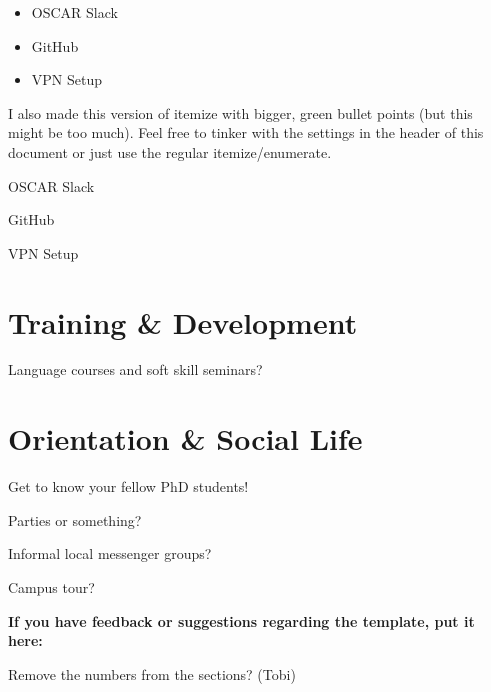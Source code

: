 \documentclass[a4paper,12pt]{article}
\begin{document}
\begin{itemize}
  \item OSCAR Slack
  \item GitHub
  \item VPN Setup
\end{itemize}

I also made this version of itemize with bigger, green bullet points (but this might be too much). Feel free to tinker with the settings in the header of this document or just use the regular itemize/enumerate.

\begin{fancyitemize}
  \item OSCAR Slack
  \item GitHub
  \item VPN Setup
\end{fancyitemize}

\section{Training \& Development}
Language courses and soft skill seminars?

\section{Orientation \& Social Life}
Get to know your fellow PhD students!

\begin{fancyitemize}
  \item Parties or something?
  \item Informal local messenger groups?
  \item Campus tour?
\end{fancyitemize}

\begin{highlightbox}
\textbf{If you have feedback or suggestions regarding the template, put it here:} \begin{fancyitemize}
    \item Remove the numbers from the sections? (Tobi)
\end{fancyitemize}
\end{highlightbox}
\end{document}
